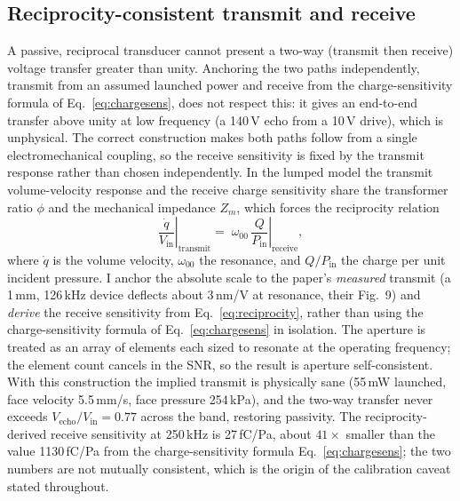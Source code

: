 \documentclass{article}
\newcommand{\sqRecip}{27}   %
\newcommand{\sqEq}{1130}    %
\newcommand{\Wtx}{55\,mW}
\newcommand{\Pface}{254\,kPa}
\newcommand{\faceVel}{5.5\,mm/s}
\newcommand{\gainMax}{0.77}
\begin{document}
\subsection{Reciprocity-consistent transmit and receive}\label{sec:transducer}
A passive, reciprocal transducer cannot present a two-way (transmit then receive) voltage
transfer greater than unity. Anchoring the two paths independently, transmit from an assumed
launched power and receive from the charge-sensitivity formula of Eq.~\eqref{eq:chargesens},
does not respect this: it gives an end-to-end transfer above unity at low frequency (a
140\,V echo from a 10\,V drive), which is unphysical. The correct construction makes both
paths follow from a single electromechanical coupling, so the receive sensitivity is fixed by
the transmit response rather than chosen independently. In the lumped model the transmit volume-velocity response and the
receive charge sensitivity share the transformer ratio $\phi$ and the mechanical impedance
$Z_m$, which forces the reciprocity relation
\begin{equation}
\left.\frac{\dot q}{V_{\mathrm{in}}}\right|_{\text{transmit}}
=\;\omega_{00}\,\left.\frac{Q}{P_{\mathrm{in}}}\right|_{\text{receive}} ,
\label{eq:reciprocity}
\end{equation}
where $\dot q$ is the volume velocity, $\omega_{00}$ the resonance, and $Q/P_{\mathrm{in}}$ the
charge per unit incident pressure. I anchor the absolute scale to the paper's \emph{measured}
transmit (a 1\,mm, 126\,kHz device deflects about 3\,nm/V at resonance, their Fig.~9) and
\emph{derive} the receive sensitivity from Eq.~\eqref{eq:reciprocity}, rather than using the charge-sensitivity formula of Eq.~\eqref{eq:chargesens} in isolation. The aperture is treated as an array of elements each sized to resonate at
the operating frequency; the element count cancels in the SNR, so the result is aperture
self-consistent. With this construction the implied transmit is physically sane
(\Wtx{} launched, face velocity \faceVel, face pressure \Pface), and the two-way transfer never
exceeds $V_{\mathrm{echo}}/V_{\mathrm{in}}=\gainMax$ across the band, restoring passivity. The
reciprocity-derived receive sensitivity at 250\,kHz is \sqRecip\,fC/Pa, about $41\times$ smaller
than the value \sqEq\,fC/Pa from the charge-sensitivity formula Eq.~\eqref{eq:chargesens}; the two numbers are not mutually
consistent, which is the origin of the calibration caveat stated throughout.
\end{document}
